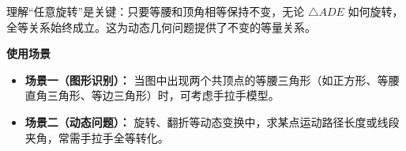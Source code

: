 \begin{explanationbox}
	理解“任意旋转”是关键：只要等腰和顶角相等保持不变，无论 $\triangle ADE$ 如何旋转，全等关系始终成立。这为动态几何问题提供了不变的等量关系。

	\medskip
	\textbf{\textcolor{CExplanation}{使用场景}}
	\begin{itemize}[leftmargin=*, itemsep=0.5em, topsep=0.4em]
		\item \textbf{场景一（图形识别）：} 当图中出现两个共顶点的等腰三角形（如正方形、等腰直角三角形、等边三角形）时，可考虑手拉手模型。
		\item \textbf{场景二（动态问题）：} 旋转、翻折等动态变换中，求某点运动路径长度或线段夹角，常需手拉手全等转化。
	\end{itemize}

\end{explanationbox}
